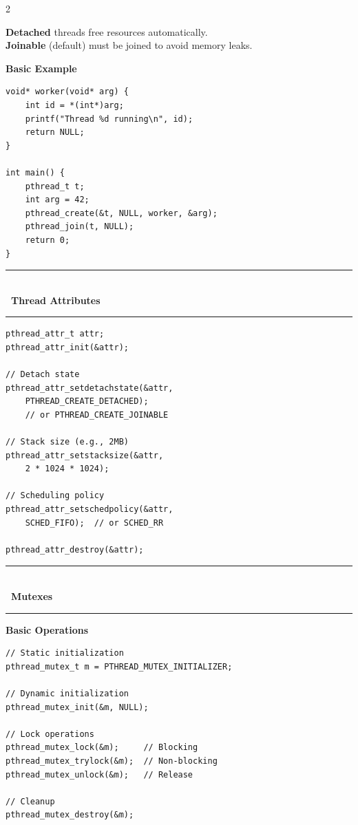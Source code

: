\documentclass[11pt,a4paper]{article}
\newcommand{\styledSection}[2]{%
    \vspace{8pt}%
    \noindent\textcolor{primaryblue}{\rule{\linewidth}{1.5pt}}\\[-8pt]
    {\fontsize{14pt}{16pt}\selectfont\bfseries\color{primaryblue}#1\ #2}\\[-4pt]
    \textcolor{primaryblue!50}{\rule{\linewidth}{0.8pt}}%
    \vspace{4pt}%
}
\newcommand{\styledSubSection}[1]{%
    \vspace{4pt}%
    {\fontsize{11pt}{13pt}\selectfont\bfseries\color{secondaryblue}#1}%
    \vspace{2pt}%
}
\begin{document}
\begin{multicols}{2}
\begin{tipbox}
\fontsize{9pt}{11pt}\selectfont
\textcolor{textlight}{\textbf{Detached} threads free resources automatically.}\\
\textcolor{textlight}{\textbf{Joinable} (default) must be joined to avoid memory leaks.}
\end{tipbox}

\styledSubSection{Basic Example}
\begin{lstlisting}
void* worker(void* arg) {
    int id = *(int*)arg;
    printf("Thread %d running\n", id);
    return NULL;
}

int main() {
    pthread_t t;
    int arg = 42;
    pthread_create(&t, NULL, worker, &arg);
    pthread_join(t, NULL);
    return 0;
}
\end{lstlisting}

\styledSection{\faSlidersH}{Thread Attributes}

\begin{lstlisting}
pthread_attr_t attr;
pthread_attr_init(&attr);

// Detach state
pthread_attr_setdetachstate(&attr, 
    PTHREAD_CREATE_DETACHED);
    // or PTHREAD_CREATE_JOINABLE

// Stack size (e.g., 2MB)
pthread_attr_setstacksize(&attr, 
    2 * 1024 * 1024);

// Scheduling policy
pthread_attr_setschedpolicy(&attr,
    SCHED_FIFO);  // or SCHED_RR

pthread_attr_destroy(&attr);
\end{lstlisting}

\styledSection{\faLock}{Mutexes}

\styledSubSection{Basic Operations}
\begin{lstlisting}
// Static initialization
pthread_mutex_t m = PTHREAD_MUTEX_INITIALIZER;

// Dynamic initialization
pthread_mutex_init(&m, NULL);

// Lock operations
pthread_mutex_lock(&m);     // Blocking
pthread_mutex_trylock(&m);  // Non-blocking
pthread_mutex_unlock(&m);   // Release

// Cleanup
pthread_mutex_destroy(&m);
\end{lstlisting}


\end{multicols}
\end{document}
